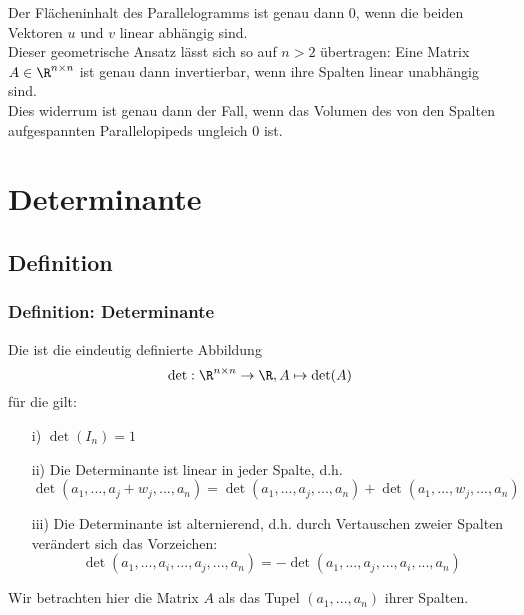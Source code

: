 %
\begin{frame}
Der Flächeninhalt des Parallelogramms ist genau dann $0$, wenn die beiden Vektoren $u$ und $v$ linear abhängig sind.\\\pause\vfill
Dieser geometrische Ansatz lässt sich so auf $n >2$ übertragen: Eine Matrix $A \in \R^{n\times n}$ ist genau dann invertierbar, wenn ihre Spalten linear unabhängig sind.\pause \\
Dies widerrum ist genau dann der Fall, wenn das Volumen des von den Spalten aufgespannten Parallelopipeds ungleich $0$ ist.
\end{frame}
%
\section{Determinante}
%
\subsection{Definition}
%
\begin{frame}\frametitle{Definition: Determinante}
Die  ist die eindeutig definierte Abbildung
$$
\det: \R^{n\times n} \to \R, A \mapsto \det(A)
$$
für die gilt:\pause
\begin{itemize}
\item[i)] $\det(I_n)=1$ \pause
\item[ii)] Die Determinante ist linear in jeder Spalte, d.h. 
$$
\det(a_1,...,a_j+w_j,...,a_n)=\det(a_1,...,a_j,...,a_n)+\det(a_1,...,w_j,...,a_n)
$$  \pause
\item[iii)] Die Determinante ist alternierend, d.h. durch Vertauschen zweier Spalten verändert sich das Vorzeichen:
$$
\det(a_1,...,a_i,...,a_j,...,a_n)=- \det(a_1,...,a_j,...,a_i,...,a_n)
$$ \pause
\end{itemize}
Wir betrachten hier die Matrix $A$ als das Tupel $(a_1,...,a_n)$ ihrer Spalten. 
\end{frame}
%
